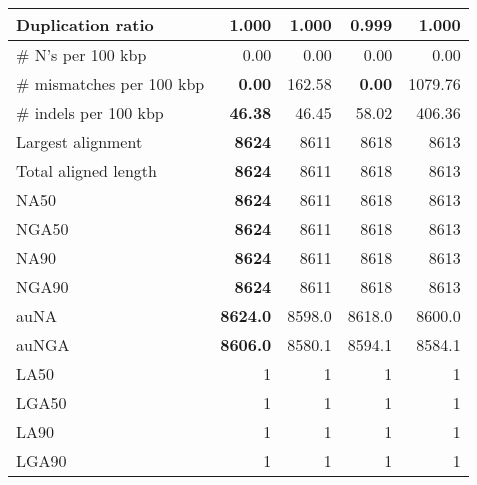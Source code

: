 \documentclass[12pt,a4paper]{article}
\begin{document}
\begin{table}[ht]
\begin{center}
\begin{tabular}{|l*{4}{|r}|}
Duplication ratio & 1.000 & 1.000 & {\bf 0.999} & 1.000 \\ \hline
\# N's per 100 kbp & 0.00 & 0.00 & 0.00 & 0.00 \\ \hline
\# mismatches per 100 kbp & {\bf 0.00} & 162.58 & {\bf 0.00} & 1079.76 \\ \hline
\# indels per 100 kbp & {\bf 46.38} & 46.45 & 58.02 & 406.36 \\ \hline
Largest alignment & {\bf 8624} & 8611 & 8618 & 8613 \\ \hline
Total aligned length & {\bf 8624} & 8611 & 8618 & 8613 \\ \hline
NA50 & {\bf 8624} & 8611 & 8618 & 8613 \\ \hline
NGA50 & {\bf 8624} & 8611 & 8618 & 8613 \\ \hline
NA90 & {\bf 8624} & 8611 & 8618 & 8613 \\ \hline
NGA90 & {\bf 8624} & 8611 & 8618 & 8613 \\ \hline
auNA & {\bf 8624.0} & 8598.0 & 8618.0 & 8600.0 \\ \hline
auNGA & {\bf 8606.0} & 8580.1 & 8594.1 & 8584.1 \\ \hline
LA50 & 1 & 1 & 1 & 1 \\ \hline
LGA50 & 1 & 1 & 1 & 1 \\ \hline
LA90 & 1 & 1 & 1 & 1 \\ \hline
LGA90 & 1 & 1 & 1 & 1 \\ \hline
\end{tabular}
\end{center}
\end{table}
\end{document}
